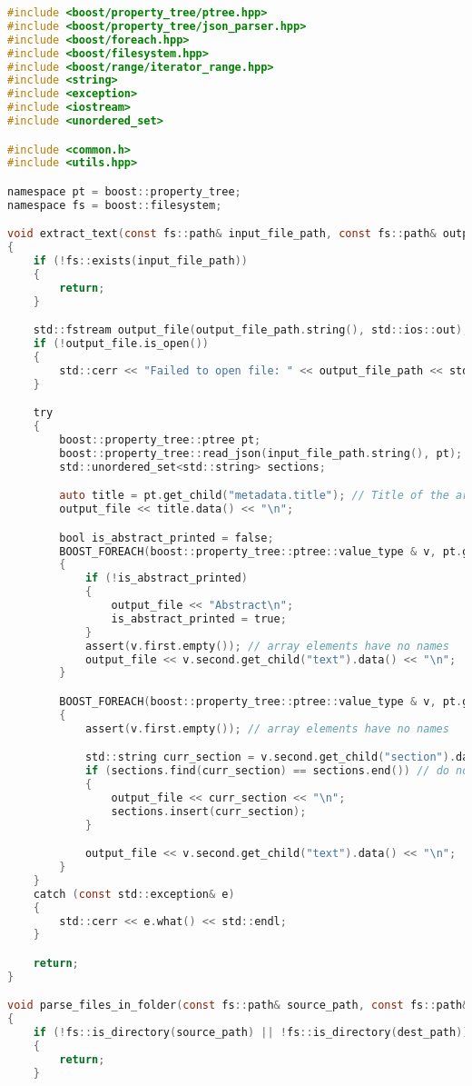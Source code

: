 \begin{lstlisting}[language=C]
#include <boost/property_tree/ptree.hpp>
#include <boost/property_tree/json_parser.hpp>
#include <boost/foreach.hpp>
#include <boost/filesystem.hpp>
#include <boost/range/iterator_range.hpp>
#include <string>
#include <exception>
#include <iostream>
#include <unordered_set>

#include <common.h>
#include <utils.hpp>

namespace pt = boost::property_tree;
namespace fs = boost::filesystem;

void extract_text(const fs::path& input_file_path, const fs::path& output_file_path)
{
	if (!fs::exists(input_file_path))
	{
		return;
	}

	std::fstream output_file(output_file_path.string(), std::ios::out);
	if (!output_file.is_open())
	{
		std::cerr << "Failed to open file: " << output_file_path << std::endl;
	}

	try
	{
		boost::property_tree::ptree pt;
		boost::property_tree::read_json(input_file_path.string(), pt);
		std::unordered_set<std::string> sections;

		auto title = pt.get_child("metadata.title"); // Title of the article
		output_file << title.data() << "\n";

		bool is_abstract_printed = false;
		BOOST_FOREACH(boost::property_tree::ptree::value_type & v, pt.get_child("abstract"))
		{
			if (!is_abstract_printed)
			{
				output_file << "Abstract\n";
				is_abstract_printed = true;
			}
			assert(v.first.empty()); // array elements have no names
			output_file << v.second.get_child("text").data() << "\n";
		}

		BOOST_FOREACH(boost::property_tree::ptree::value_type & v, pt.get_child("body_text"))
		{
			assert(v.first.empty()); // array elements have no names

			std::string curr_section = v.second.get_child("section").data();
			if (sections.find(curr_section) == sections.end()) // do not duplicate sections name in parsed data
			{
				output_file << curr_section << "\n";
				sections.insert(curr_section);
			}

			output_file << v.second.get_child("text").data() << "\n";
		}
	}
	catch (const std::exception& e)
	{
		std::cerr << e.what() << std::endl;
	}

	return;
}

void parse_files_in_folder(const fs::path& source_path, const fs::path& dest_path)
{
	if (!fs::is_directory(source_path) || !fs::is_directory(dest_path))
	{
		return;
	}


\end{lstlisting}
